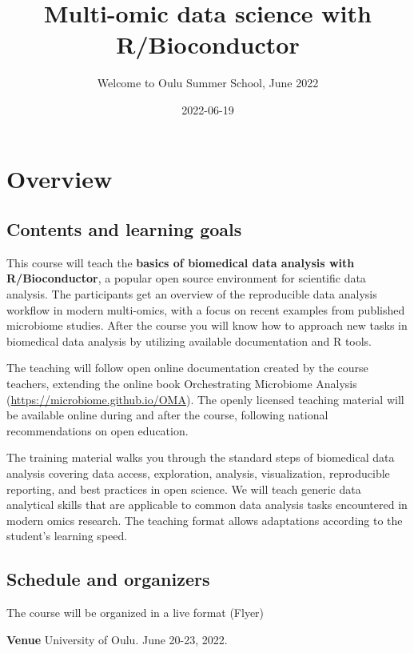 \documentclass[
  oneside]{book}
\title{Multi-omic data science with R/Bioconductor}
\subtitle{Welcome to Oulu Summer School, June 2022}
\author{}
\date{\vspace{-2.5em}2022-06-19}
\begin{document}
\maketitle

{
\setcounter{tocdepth}{1}
\tableofcontents
}
\hypertarget{overview}{%
\chapter{Overview}\label{overview}}

\hypertarget{contents-and-learning-goals}{%
\section{Contents and learning goals}\label{contents-and-learning-goals}}

This course will teach the \textbf{basics of biomedical data analysis with
R/Bioconductor}, a popular open source environment for scientific
data analysis. The participants get an overview of the reproducible
data analysis workflow in modern multi-omics, with a focus on recent
examples from published microbiome studies. After the course you will
know how to approach new tasks in biomedical data analysis by
utilizing available documentation and R tools.

The teaching will follow open online documentation created by the
course teachers, extending the online book Orchestrating Microbiome
Analysis (\url{https://microbiome.github.io/OMA}). The openly licensed
teaching material will be available online during and after the
course, following national recommendations on open education.

The training material walks you through the standard steps of
biomedical data analysis covering data access, exploration, analysis,
visualization, reproducible reporting, and best practices in open
science. We will teach generic data analytical skills that are
applicable to common data analysis tasks encountered in modern omics
research. The teaching format allows adaptations according to the
student's learning speed.

\hypertarget{schedule-and-organizers}{%
\section{Schedule and organizers}\label{schedule-and-organizers}}

The course will be organized in a live format (Flyer)

\textbf{Venue} University of Oulu. June 20-23, 2022.
\end{document}
